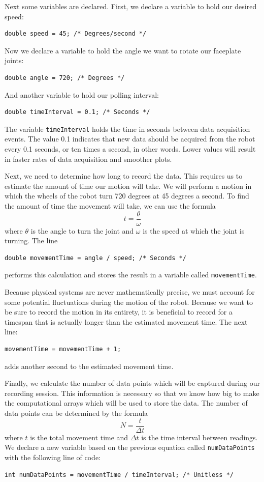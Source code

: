 \documentclass{article}
\begin{document}
Next some variables are declared. First, we declare a variable to hold our
desired speed:
\begin{verbatim}
double speed = 45; /* Degrees/second */
\end{verbatim}
Now we declare a variable to hold the angle we want to rotate our faceplate joints:
\begin{verbatim}
double angle = 720; /* Degrees */
\end{verbatim}
And another variable to hold our polling interval:
\begin{verbatim}
double timeInterval = 0.1; /* Seconds */
\end{verbatim}
The variable \texttt{timeInterval} holds the time in seconds between data acquisition
events. The value 0.1 indicates that new data should be acquired from the robot
every 0.1 seconds, or ten times a second, in other words. Lower values will result in faster
rates of data acquisition and smoother plots. 

Next, we need to determine how long to record the data. This requires us to estimate the 
amount of time our motion will take. We will perform a motion in which the wheels of the
robot turn 720 degrees at 45 degrees a second. To find the amount of time the movement 
will take, we can use the formula
\begin{equation*}
t = \frac{\theta}{\omega}
\end{equation*}
where $\theta$ is the angle to turn the joint and $\omega$ is the speed at which the
joint is turning. The line
\begin{verbatim}
double movementTime = angle / speed; /* Seconds */
\end{verbatim}
performs this calculation and stores the result in a variable called \texttt{movementTime}.

Because physical systems are never mathematically precise, we must account for some
potential fluctuations during the motion of the robot. Because we want to be sure 
to record the motion in its entirety, it is beneficial to record for a timespan that
is actually longer than the estimated movement time. The next line:
\begin{verbatim}
movementTime = movementTime + 1; 
\end{verbatim}
adds another second to the estimated movement time.

Finally, we calculate the number of data points which will be captured during our 
recording session. This information is necessary so that we know how big to make
the computational arrays which will be used to store the data. The number
of data points can be determined by the formula
\begin{equation*}
N = \frac{t}{\Delta t}
\end{equation*}
where $t$ is the total movement time and $\Delta t$ is the time interval between
readings. We declare a new variable based on the previous equation called \texttt{numDataPoints} with 
the following line of code:
\begin{verbatim}
int numDataPoints = movementTime / timeInterval; /* Unitless */
\end{verbatim}
\end{document}

